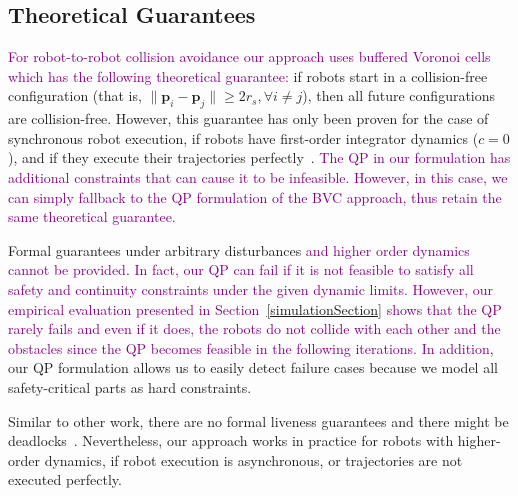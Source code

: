 \documentclass{svproc}
\newcommand{\vp}{\mathbf{p}}
\newcommand{\changed}[1]{\textcolor{purple}{#1}}
\begin{document}

\subsection{Theoretical Guarantees} \label{theoreticalGuarantees}


\changed{For robot-to-robot collision avoidance our approach uses buffered Voronoi cells which has the following theoretical guarantee:}
if robots start in a collision-free configuration (that is, $\|\vp_i - \vp_j\| \geq 2r_s, \forall i\neq j$), then all future configurations are collision-free.
However, this guarantee has only been proven for the case of synchronous robot execution, if robots have first-order integrator dynamics ($c=0$), and if they execute their trajectories perfectly~\cite{bufferedVoronoiCells}.
\changed{The QP in our formulation has additional constraints that can cause it to be infeasible. However, in this case, we can simply fallback to the QP formulation of the BVC approach, thus retain the same theoretical guarantee.}

Formal guarantees under arbitrary disturbances \changed{and higher order dynamics cannot be provided}.
\changed{In fact, our QP can fail if it is not feasible to satisfy all safety and continuity constraints under the given dynamic limits.}
\changed{However, our empirical evaluation presented in Section~\ref{simulationSection} shows that the QP rarely fails and even if it does, the robots do not collide with each other and the obstacles since the QP becomes feasible in the following iterations.}
\changed{In addition}, our QP formulation allows us to easily detect failure cases because we model all safety-critical parts as hard constraints.

Similar to other work, there are no formal liveness guarantees and there might be deadlocks~\cite{bufferedVoronoiCells}.
Nevertheless, our approach works in practice for robots with higher-order dynamics, if robot execution is asynchronous, or trajectories are not executed perfectly.


\end{document}
